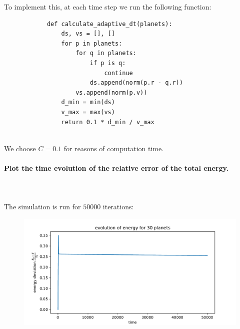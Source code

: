         \newpage \noindent
        To implement this, at each time step we run the following function:
        \begin{lstlisting}
            def calculate_adaptive_dt(planets):
                ds, vs = [], []
                for p in planets:
                    for q in planets:
                        if p is q:
                            continue
                        ds.append(norm(p.r - q.r))
                    vs.append(norm(p.v))
                d_min = min(ds)
                v_max = max(vs)
                return 0.1 * d_min / v_max \end{lstlisting} \ \\
        We choose $C=0.1$ for reasons of computation time.


    \paragraph{Plot the time evolution of the relative error of the total 
        energy.
    } \ \\
        \\ 
        The simulation is run for $50000$ iterations:
        \begin{figure}[h!]
            \centering
            \includegraphics[width=\textwidth]{./figures/task2_30body_energy_new.pdf}
        \end{figure} \ \\ 

    \newpage
